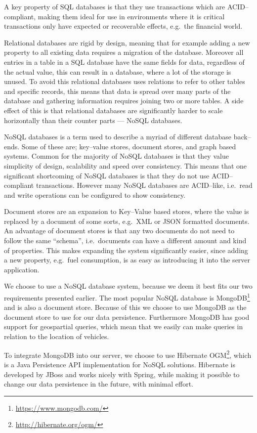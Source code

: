 A key property of SQL databases is that they use transactions which are ACID--compliant\cite{Haerder:1983:PTD:289.291}, making them ideal for use in environments where it is critical transactions only have expected or recoverable effects, e.g.~the financial world.

Relational databases are rigid by design, meaning that for example adding a new property to all existing data requires a migration of the database.
Moreover all entries in a table in a SQL database have the same fields for data, regardless of the actual value, this can result in a database, where a lot of the storage is unused.
To avoid this relational databases uses relations to refer to other tables and specific records, this means that data is spread over many parts of the database and gathering information requires joining two or more tables.
A side effect of this is that relational databases are significantly harder to scale horizontally than their counter parts --- NoSQL databases.

\bigskip
NoSQL databases is a term used to describe a myriad of different database back--ends.
Some of these are; key--value stores, document stores, and graph based systems.
Common for the majority of NoSQL databases is that they value simplicity of design, scalability and speed over consistency.
This means that one significant shortcoming of NoSQL databases is that they do not use ACID--compliant transactions.
However many NoSQL databases are ACID--like, i.e.~read and write operations can be configured to show consistency.

Document stores are an expansion to Key--Value based stores, where the value is replaced by a document of some sorts, e.g.~XML or JSON formatted documents.
An advantage of document stores is that any two documents do not need to follow the same ``schema'', i.e.~documents can have a different amount and kind of properties.
This makes expanding the system significantly easier, since adding a new property, e.g.~fuel consumption, is as easy as introducing it into the server application.

\bigskip
We choose to use a NoSQL database system, because we deem it best fits our two requirements presented earlier.
The most popular NoSQL database is MongoDB\footnote{\url{https://www.mongodb.com/}} and is also a document store.\cite{DB_RANKINGS}
Because of this we choose to use MongoDB as the document store to use for our data persistence.
Furthermore MongoDB has good support for geospartial queries, which mean that we easily can make queries in relation to the location of vehicles.

\bigskip
To integrate MongoDB into our server, we choose to use Hibernate OGM\footnote{\url{http://hibernate.org/ogm/}}, which is a Java Persistence API implementation for NoSQL solutions.
Hibernate is developed by JBoss and works nicely with Spring, while making it possible to change our data persistence in the future, with minimal effort.
